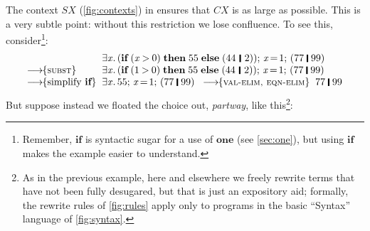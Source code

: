 \documentclass[acmsmall]{acmart}
\newcommand{\Conid}[1]{\mathit{#1}}
\newcommand{\Varid}[1]{\mathit{#1}}
\begin{document}
The context \ensuremath{\Conid{SX}} (\cref{fig:contexts}) in  ensures that \ensuremath{CX} is as large as possible.
This is a very subtle point:
without this restriction we lose confluence.  To see this, consider\footnote{Remember, \ensuremath{\textbf{if}} is syntactic sugar for
  a use of \ensuremath{\textbf{one}} (see \cref{sec:one}), but using \ensuremath{\textbf{if}} makes the example easier to understand.}:
$$
\begin{array}{l@{\;\;}l}
                                 & \ensuremath{\exists\Varid{x}.\,(\textbf{if}\;(\Varid{x}\mathbin{>}\mathrm{0})\;\textbf{then}\;\mathrm{55}\;\textbf{else}\;(\mathrm{44}\hspace{0.2em}\mathop{\rule[-0.1em]{0.15em}{0.75em}}\hspace{0.2em}\mathrm{2}));\,\Varid{x}\hspace{-0.14em}=\hspace{-0.14em}\mathrm{1};\,(\mathrm{77}\;\rule[-0.1em]{0.15em}{0.75em}\;\mathrm{99})}\\
 \movestoR{subst}                & \ensuremath{\exists\Varid{x}.\,(\textbf{if}\;(\mathrm{1}\mathbin{>}\mathrm{0})\;\textbf{then}\;\mathrm{55}\;\textbf{else}\;(\mathrm{44}\hspace{0.2em}\mathop{\rule[-0.1em]{0.15em}{0.75em}}\hspace{0.2em}\mathrm{2}));\,\Varid{x}\hspace{-0.14em}=\hspace{-0.14em}\mathrm{1};\,(\mathrm{77}\;\rule[-0.1em]{0.15em}{0.75em}\;\mathrm{99})}\\
 \movestoC{\text{simplify \ensuremath{\textbf{if}}}} & \ensuremath{\exists\Varid{x}.\,\mathrm{55};\,\Varid{x}\hspace{-0.14em}=\hspace{-0.14em}\mathrm{1};\,(\mathrm{77}\;\rule[-0.1em]{0.15em}{0.75em}\;\mathrm{99})} \;\;    %
 \movestoR{val-elim, eqn-elim}   \;\;  \ensuremath{\mathrm{77}\;\rule[-0.1em]{0.15em}{0.75em}\;\mathrm{99}}\\
\end{array}
$$
But suppose instead we floated the choice out, \emph{partway}, like this\footnote{
  As in the previous example, here and elsewhere we freely rewrite terms that have not
  been fully desugared, but that is just an expository aid;
  formally, the rewrite rules of \cref{fig:rules} apply only to programs in the basic ``Syntax'' language of \cref{fig:syntax}.}:
\end{document}
